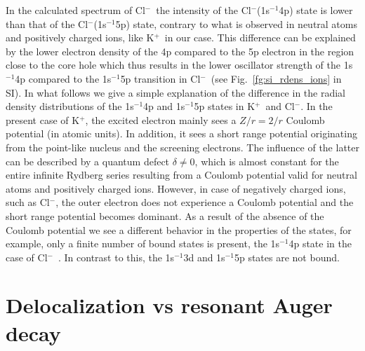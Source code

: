 \documentclass[journal=jpclcd,manuscript=letter]{achemso}
\newcommand{\cli}{Cl$^{-}$}
\newcommand{\ki}{K$^{+}$}
\begin{document}
In the calculated spectrum of \cli~the intensity of the Cl$^{-}$(1s$^{-1}$4p) state is lower than that of the \cli(1s$^{-1}$5p) state, contrary to what is observed in neutral atoms and positively charged ions, like \ki~in our case. This difference can be explained by the lower electron density of the 4p compared to the 5p electron in the region close to the core hole which thus results in the lower oscillator strength of the 1s$^{-1}$4p compared to the 1s$^{-1}$5p transition in \cli~(see Fig.\ \ref{fg:si_rdens_ions} in SI). In what follows we give a simple explanation of the difference in the radial density distributions of the 1s$^{-1}$4p and 1s$^{-1}$5p states in \ki~and \cli. In the present case of \ki, the excited electron mainly sees a $Z/r = 2/r$ Coulomb potential (in atomic units). In addition, it sees a short range potential originating from the point-like nucleus and the screening electrons. The influence of the latter can be described by a quantum defect $\delta \ne 0$, which is almost constant for the entire infinite Rydberg series resulting from a Coulomb potential valid for neutral atoms and positively charged ions. However, in case of negatively charged ions, such as \cli, the outer electron does not experience a Coulomb potential and the short range potential becomes dominant. As a result of the absence of the Coulomb potential we see a different behavior in the properties of the states, for example, only a finite number of bound states is present, the 1s$^{-1}$4p state in the case of \cli~\citep{buckman94:539}. In contrast to this, the 1s$^{-1}$3d and 1s$^{-1}$5p states are not bound. 



\section{Delocalization vs resonant Auger decay}
\end{document}
